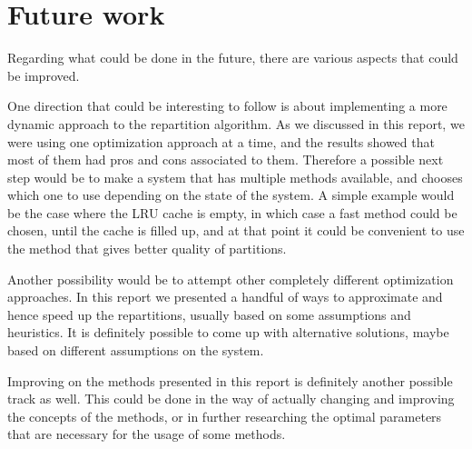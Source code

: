 \section{Future work}\label{sec:future-work}
Regarding what could be done in the future, there are various aspects that could be improved. 

One direction that could be interesting to follow is about implementing a more dynamic approach to the repartition algorithm. As we discussed in this report, we were using one optimization approach at a time, and the results showed that most of them had pros and cons associated to them. Therefore a possible next step would be to make a system that has multiple methods available, and chooses which one to use depending on the state of the system. A simple example would be the case where the LRU cache is empty, in which case a fast method could be chosen, until the cache is filled up, and at that point it could be convenient to use the method that gives better quality of partitions.

Another possibility would be to attempt other completely different optimization approaches. In this report we presented a handful of ways to approximate and hence speed up the repartitions, usually based on some assumptions and heuristics. It is definitely possible to come up with alternative solutions, maybe based on different assumptions on the system.

Improving on the methods presented in this report is definitely another possible track as well. This could be done in the way of actually changing and improving the concepts of the methods, or in further researching the optimal parameters that are necessary for the usage of some methods.


